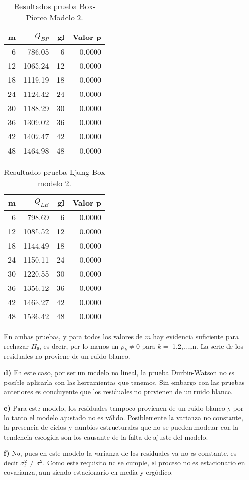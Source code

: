 \documentclass{tufte-handout}
\begin{document}
\begin{table}[ht]
\centering
\begin{tabular}{rrrr}
  \hline
m & $Q_{BP}$ & gl & Valor p \\ 
  \hline
6 & 786.05 & 6 & 0.0000 \\ 
  12 & 1063.24 & 12 & 0.0000 \\ 
  18 & 1119.19 & 18 & 0.0000 \\ 
  24 & 1124.42 & 24 & 0.0000 \\ 
  30 & 1188.29 & 30 & 0.0000 \\ 
  36 & 1309.02 & 36 & 0.0000 \\ 
  42 & 1402.47 & 42 & 0.0000 \\ 
  48 & 1464.98 & 48 & 0.0000 \\ 
   \hline
\end{tabular}
\caption{Resultados prueba Box-Pierce Modelo 2.} 
\label{tab:p3_bp}
\end{table}

\begin{table}[ht]
\centering
\begin{tabular}{rrrr}
  \hline
m & $Q_{LB}$ & gl & Valor p \\ 
  \hline
6 & 798.69 & 6 & 0.0000 \\ 
  12 & 1085.52 & 12 & 0.0000 \\ 
  18 & 1144.49 & 18 & 0.0000 \\ 
  24 & 1150.11 & 24 & 0.0000 \\ 
  30 & 1220.55 & 30 & 0.0000 \\ 
  36 & 1356.12 & 36 & 0.0000 \\ 
  42 & 1463.27 & 42 & 0.0000 \\ 
  48 & 1536.42 & 48 & 0.0000 \\
   \hline
\end{tabular}
\caption{Resultados prueba Ljung-Box modelo 2.} 
\label{tab:p3_lb}
\end{table}

En ambas pruebas, y para todos los valores de $m$ hay evidencia suficiente para rechazar $H_0$, es decir, por lo menos un $\rho_k \neq 0$ para $k=$ 1,2,...,m. La serie de los residuales no proviene de un ruido blanco.

\textbf{d)} En este caso, por ser un modelo no lineal, la prueba Durbin-Watson no es posible aplicarla con las herramientas que tenemos. Sin embargo con las pruebas anteriores es concluyente que los residuales no provienen de un ruido blanco.


\textbf{e)} Para este modelo, los residuales tampoco provienen de un ruido blanco y por lo  tanto el modelo ajustado no es válido. Posiblemente la varianza no constante, la presencia de ciclos y cambios estructurales que no se  pueden modelar con la tendencia escogida son los causante de la falta de ajuste del modelo.

\textbf{f)} No, pues en este modelo la varianza de los residuales ya no es constante, es decir $\sigma_t^2 \neq \sigma^2 $. Como este requisito no se cumple, el proceso no es estacionario en covarianza, aun siendo estacionario en media y ergódico.
\end{document}
